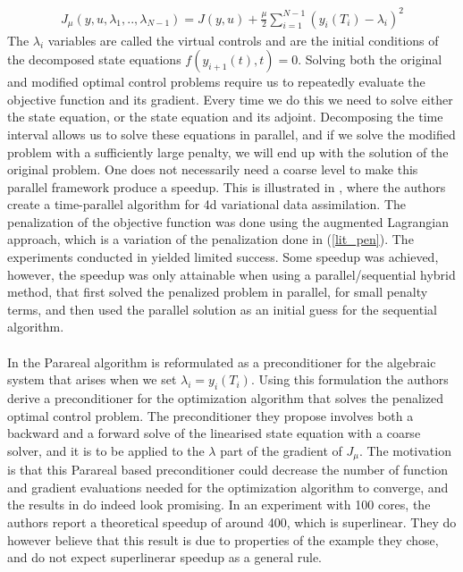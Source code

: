 \begin{align}
J_{\mu}(y,u,\lambda_1,..,\lambda_{N-1})=J(y,u) +\frac{\mu }{2}\sum_{i=1}^{N-1}(y_i(T_i)-\lambda_i)^2 \label{lit_pen}
\end{align} 
The $\lambda_i$ variables are called the virtual controls and are the initial conditions of the decomposed state equations $f(y_{i+1}(t),t)=0$. Solving both the original and modified optimal control problems require us to repeatedly evaluate the objective function and its gradient. Every time we do this we need to solve either the state equation, or the state equation and its adjoint. Decomposing the time interval allows us to solve these equations in parallel, and if we solve the modified problem with a sufficiently large penalty, we will end up with the solution of the original problem. One does not necessarily need a coarse level to make this parallel framework produce a speedup. This is illustrated in \cite{rao2016time}, where the authors create a time-parallel algorithm for 4d variational data assimilation. The penalization of the objective function was done using the augmented Lagrangian approach, which is a variation of the penalization done in (\ref{lit_pen}). The experiments conducted in \cite{rao2016time} yielded limited success. Some speedup was achieved, however, the speedup was only attainable when using a parallel/sequential hybrid method, that first solved the penalized problem in parallel, for small penalty terms, and then used the parallel solution as an initial guess for the sequential algorithm. 
\\
\\
In \cite{maday2002parareal} the Parareal algorithm is reformulated as a preconditioner for the algebraic system that arises when we set $\lambda_i=y_{i}(T_i)$. Using this formulation the authors derive a preconditioner for the optimization algorithm that solves the penalized optimal control problem. The preconditioner they propose involves both a backward and a forward solve of the linearised state equation with a coarse solver, and it is to be applied to the $\lambda$ part of the gradient of $J_{\mu}$. The motivation is that this Parareal based preconditioner could decrease the number of function and gradient evaluations needed for the optimization algorithm to converge, and the results in \cite{maday2002parareal} do indeed look promising. In an experiment with 100 cores, the authors report a theoretical speedup of around 400, which is superlinear. They do however believe that this result is due to properties of the example they chose, and do not expect superlinerar speedup as a general rule. 
